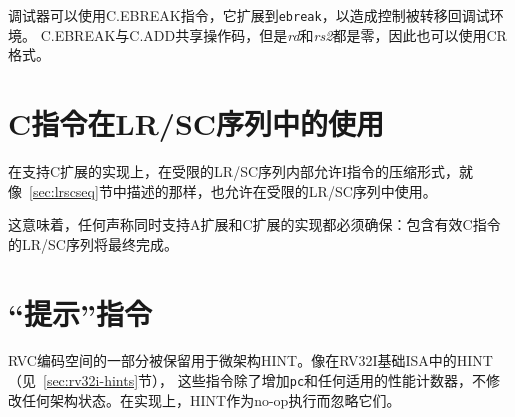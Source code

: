 调试器可以使用C.EBREAK指令，它扩展到{\tt ebreak}，以造成控制被转移回调试环境。
C.EBREAK与C.ADD共享操作码，但是{\em rd}和{\em rs2}都是零，因此也可以使用CR格式。

\section{C指令在LR/SC序列中的使用}

在支持C扩展的实现上，在受限的LR/SC序列内部允许I指令的压缩形式，就像~\ref{sec:lrscseq}节中描述的那样，也允许在受限的LR/SC序列中使用。

\begin{commentary}
这意味着，任何声称同时支持A扩展和C扩展的实现都必须确保：包含有效C指令的LR/SC序列将最终完成。
\end{commentary}

\section{“提示”指令}
\label{sec:rvc-hints}

RVC编码空间的一部分被保留用于微架构HINT。像在RV32I基础ISA中的HINT（见~\ref{sec:rv32i-hints}节），
这些指令除了增加{\tt pc}和任何适用的性能计数器，不修改任何架构状态。在实现上，HINT作为no-op执行而忽略它们。

